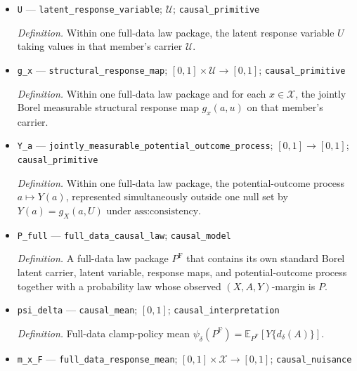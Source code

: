 \documentclass{article}
\begin{document}
\begin{itemize}
  \par\smallskip\noindent\emph{Definition.} Generic notation for the law-specific standard Borel latent-response carrier \(\mathcal U\), bound separately inside each full-data law package.
  \item \texttt{U} --- \texttt{latent\_\allowbreak{}response\_\allowbreak{}variable}; \(\mathcal U\); \texttt{causal\_\allowbreak{}primitive}
  \par\smallskip\noindent\emph{Definition.} Within one full-data law package, the latent response variable \(U\) taking values in that member's carrier \(\mathcal U\).
  \item \texttt{g\_\allowbreak{}x} --- \texttt{structural\_\allowbreak{}response\_\allowbreak{}map}; \([0,1]\times\mathcal U\to[0,1]\); \texttt{causal\_\allowbreak{}primitive}
  \par\smallskip\noindent\emph{Definition.} Within one full-data law package and for each \(x\in\mathcal X\), the jointly Borel measurable structural response map \(g_x(a,u)\) on that member's carrier.
  \item \texttt{Y\_\allowbreak{}a} --- \texttt{jointly\_\allowbreak{}measurable\_\allowbreak{}potential\_\allowbreak{}outcome\_\allowbreak{}process}; \([0,1]\to[0,1]\); \texttt{causal\_\allowbreak{}primitive}
  \par\smallskip\noindent\emph{Definition.} Within one full-data law package, the potential-outcome process \(a\mapsto Y(a)\), represented simultaneously outside one null set by \(Y(a)=g_X(a,U)\) under \(\text{ass:consistency}\).
  \item \texttt{P\_\allowbreak{}full} --- \texttt{full\_\allowbreak{}data\_\allowbreak{}causal\_\allowbreak{}law}; \texttt{causal\_\allowbreak{}model}
  \par\smallskip\noindent\emph{Definition.} A full-data law package \(P^{\mathrm F}\) that contains its own standard Borel latent carrier, latent variable, response maps, and potential-outcome process together with a probability law whose observed \((X,A,Y)\)-margin is \(P\).
  \item \texttt{psi\_\allowbreak{}delta} --- \texttt{causal\_\allowbreak{}mean}; \([0,1]\); \texttt{causal\_\allowbreak{}interpretation}
  \par\smallskip\noindent\emph{Definition.} Full-data clamp-policy mean \(\psi_\delta(P^{\mathrm F})=\mathbb E_{P^{\mathrm F}}[Y\{d_\delta(A)\}]\).
  \item \texttt{m\_\allowbreak{}x\_\allowbreak{}F} --- \texttt{full\_\allowbreak{}data\_\allowbreak{}response\_\allowbreak{}mean}; \([0,1]\times\mathcal X\to[0,1]\); \texttt{causal\_\allowbreak{}nuisance}

\end{itemize}
\end{document}
